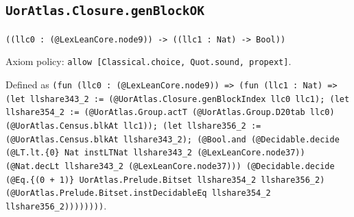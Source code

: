 \documentclass[11pt]{article}
\begin{document}
\subsection*{\texttt{UorAtlas.Closure.genBlockOK}}
\noindent\texttt{((llc0 : (@LexLeanCore.node9)) -> ((llc1 : Nat) -> Bool))}\par
\noindent Axiom policy: \texttt{allow [Classical.choice, Quot.sound, propext]}.\par
\noindent Defined as \texttt{(fun (llc0 : (@LexLeanCore.node9)) => (fun (llc1 : Nat) => (let llshare343\_2 := (@UorAtlas.Closure.genBlockIndex llc0 llc1); (let llshare354\_2 := (@UorAtlas.Group.actT (@UorAtlas.Group.D20tab llc0) (@UorAtlas.Census.blkAt llc1)); (let llshare356\_2 := (@UorAtlas.Census.blkAt llshare343\_2); (@Bool.and (@Decidable.decide (@LT.lt.\{0\} Nat instLTNat llshare343\_2 (@LexLeanCore.node37)) (@Nat.decLt llshare343\_2 (@LexLeanCore.node37))) (@Decidable.decide (@Eq.\{(0 + 1)\} UorAtlas.Prelude.Bitset llshare354\_2 llshare356\_2) (@UorAtlas.Prelude.Bitset.instDecidableEq llshare354\_2 llshare356\_2))))))))}.\par
\end{document}
